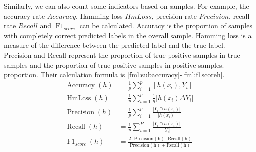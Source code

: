 Similarly, we can also count some indicators based on samples. For example, the accuracy rate \(Accuracy\), Hamming loss \(HmLoss\), precision rate \(Precision\), recall rate \(Recall\) and \(\operatorname{F1}_{score}\) can be calculated. Accuracy is the proportion of samples with completely correct predicted labels in the overall sample. Hamming loss is a measure of the difference between the predicted label and the true label. Precision and Recall represent the proportion of true positive samples in true samples and the proportion of true positive samples in positive samples. proportion. Their calculation formula is \ref{fml:subaccuracy}-\ref{fml:f1scoreh}.
\begin{align}
	\operatorname{Accuracy}(h)   & =\frac{1}{p} \sum_{i=1}^{p}[{h}(x_{i}), Y_{i}] \label{fml:subaccuracy}                                                                                  \\
	\operatorname{HmLoss}(h)     & =\frac{1}{p} \sum_{i=1}^{p} \frac{1}{q}|h(x_{i}) \Delta Y_{i}| \label{fml:hmloss}                                                                       \\
	\operatorname{Precision}(h)  & =\frac{1}{p} \sum_{i=1}^{p} \frac{|Y_{i} \cap h(x_{i})|}{|h(x_{i})|} \label{fml:Precisionh}                                                             \\
	\operatorname{Recall}(h)     & =\frac{1}{p} \sum_{i=1}^{P} \frac{|Y_{i} \cap h(x_{i})|}{|Y_{i}|}    \label{fml:Recallh}                                                                \\
	\operatorname{F1}_{score}(h) & =\frac{2 \cdot \operatorname{Precision(h)} \cdot \operatorname {Recall(h)}}{\operatorname {Precision(h)}+\operatorname{Recall(h)}} \label{fml:f1scoreh}
\end{align}



